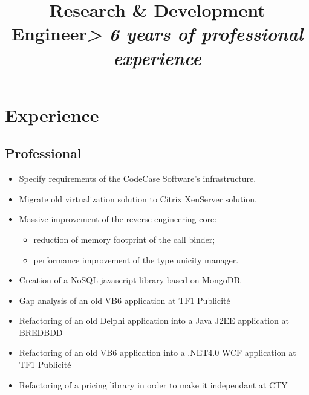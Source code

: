 \documentclass[11pt, a4paper]{moderncv}
\title{\textbf{Research \& Development Engineer}\newline \Large{\textit{> 6 years of professional experience}}}
\begin{document}
\maketitle

\section{Experience}
\subsection{Professional}
{
	\begin{itemize}
		\renewcommand{\labelitemi}{$\bullet$  }
		\item Specify requirements of the CodeCase Software's infrastructure.
		\item Migrate old virtualization solution to Citrix XenServer solution.
	\end{itemize}
}
{
	\begin{itemize}
		\renewcommand{\labelitemi}{$\bullet$  }
		\item Massive improvement of the reverse engineering core:
		\begin{itemize}
			\item reduction of memory footprint of the call binder;
			\item performance improvement of the type unicity manager.
		\end{itemize}
		\item Creation of a NoSQL javascript library based on MongoDB.
	\end{itemize}
}
{
	\begin{itemize}
		\renewcommand{\labelitemi}{$\bullet$  }
		\item Gap analysis of an old VB6 application at TF1 Publicit\'e
		\item Refactoring of an old Delphi application into a Java J2EE application at BREDBDD
		\item Refactoring of an old VB6 application into a .NET4.0 WCF application at TF1 Publicit\'e
		\item Refactoring of a pricing library in order to make it independant at CTY
	\end{itemize}
}
\end{document}
